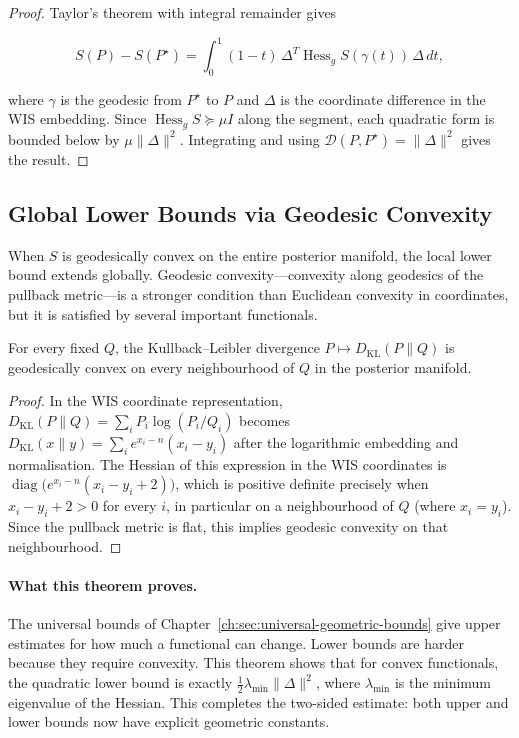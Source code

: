 \begin{proof}
Taylor's theorem with integral remainder gives

\[
S(P) - S(P^\star)
=
\int_0^1 (1-t)\,\Delta^T\operatorname{Hess}_g S(\gamma(t))\,\Delta\,dt,
\]

where $\gamma$ is the geodesic from $P^\star$ to $P$ and
$\Delta$ is the coordinate difference in the WIS embedding.
Since $\operatorname{Hess}_g S \succeq \mu I$ along the segment,
each quadratic form is bounded below by $\mu\|\Delta\|^2$.  Integrating
and using $\mathcal D(P,P^\star)=\|\Delta\|^2$ gives the result.\end{proof}

\subsection{Global Lower Bounds via Geodesic Convexity}\label{ch:sec:global-lower-bounds-via-geodesic-convexity}

When $S$ is geodesically convex on the entire posterior manifold, the
local lower bound extends globally.  Geodesic convexity---convexity
along geodesics of the pullback metric---is a stronger condition than
Euclidean convexity in coordinates, but it is satisfied by several
important functionals.

\begin{lemma}
\label{ch:lem:kl-convex}
For every fixed $Q$, the Kullback--Leibler divergence $P\mapsto D_{\mathrm{KL}}(P\|Q)$ is
geodesically convex on every neighbourhood of $Q$ in the posterior manifold.
\end{lemma}

\begin{proof}
In the WIS coordinate representation,
$D_{\mathrm{KL}}(P\|Q) = \sum_i P_i\log(P_i/Q_i)$ becomes
$D_{\mathrm{KL}}(x\|y) = \sum_i e^{x_i-n}(x_i-y_i)$ after the
logarithmic embedding and normalisation.  The Hessian of this
expression in the WIS coordinates is
$\operatorname{diag}\bigl(e^{x_i-n}(x_i-y_i+2)\bigr)$,
which is positive definite precisely when $x_i-y_i+2>0$ for every $i$, in
particular on a neighbourhood of $Q$ (where $x_i=y_i$).  Since the pullback
metric is flat, this implies geodesic convexity on that neighbourhood.
\end{proof}

\paragraph{What this theorem proves.}
The universal bounds of Chapter~\ref{ch:sec:universal-geometric-bounds} give upper estimates for how much a functional can change.  Lower bounds are harder because they require convexity.  This theorem shows that for convex functionals, the quadratic lower bound is exactly $\frac12\lambda_{\min}\|\Delta\|^2$, where $\lambda_{\min}$ is the minimum eigenvalue of the Hessian.  This completes the two-sided estimate: both upper and lower bounds now have explicit geometric constants.

